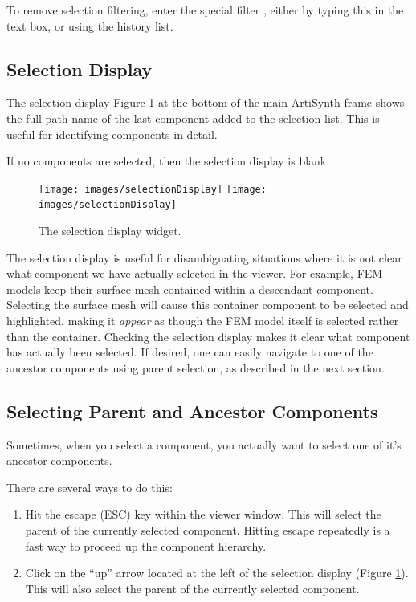 \documentclass{article}
\begin{document}
To remove selection filtering, enter the special filter {\tt *}, either by
typing this in the text box, or using the history list.

\subsection{Selection Display}
\label{selectionDisplaySec}

The selection display Figure \ref{selectionDisplayWidgetFig} at the bottom of the
main ArtiSynth frame shows the full path name of the last component
added to the selection list. This is useful for identifying components
in detail.

If no components are selected, then the selection display is blank.

\begin{figure}
\begin{center}
\iflatexml
\texttt{[image: images/selectionDisplay]}
\else
\texttt{[image: images/selectionDisplay]}
\fi
\end{center}
\caption{The selection display widget.}%
\label{selectionDisplayWidgetFig}
\end{figure}

The selection display is useful for disambiguating situations where it
is not clear what component we have actually selected in the viewer.
For example, FEM models keep their surface mesh contained within a
descendant component. Selecting the surface mesh will cause this
container component to be selected and highlighted, making it {\it
appear} as though the FEM model itself is selected rather than the
container. Checking the selection display makes it clear
what component has actually been selected. If desired,
one can easily navigate to one of the ancestor components
using parent selection, as described in the next section.

\subsection{Selecting Parent and Ancestor Components}
\label{selectingAncestorsSec}

Sometimes, when you select a component, you actually want to select
one of it's ancestor components. 

There are several ways to do this:

\begin{enumerate}

\item Hit the escape ({\sf ESC}) key within the viewer window. This
will select the parent of the currently selected component. Hitting
escape repeatedly is a fast way to proceed up the component hierarchy.

\item Click on the ``up'' arrow located at the left of the selection
display (Figure \ref{selectionDisplayWidgetFig}). This will also
select the parent of the currently selected component.

\end{enumerate}
\end{document}
